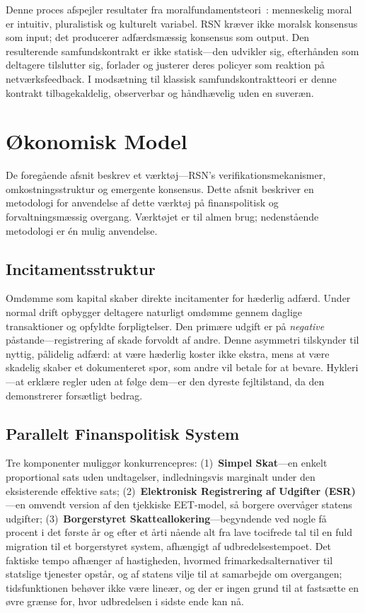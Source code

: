 \documentclass[11pt,a4paper,twocolumn]{article}
\begin{document}
Denne proces afspejler resultater fra moralfundamentsteori~\cite{haidt2012}: menneskelig moral er intuitiv, pluralistisk og kulturelt variabel. RSN kræver ikke moralsk konsensus som input; det producerer adfærdsmæssig konsensus som output. Den resulterende samfundskontrakt er ikke statisk---den udvikler sig, efterhånden som deltagere tilslutter sig, forlader og justerer deres policyer som reaktion på netværksfeedback. I modsætning til klassisk samfundskontraktteori er denne kontrakt tilbagekaldelig, observerbar og håndhævelig uden en suveræn.

\section{Økonomisk Model}

De foregående afsnit beskrev et værktøj---RSN's verifikationsmekanismer, omkostningsstruktur og emergente konsensus. Dette afsnit beskriver en metodologi for anvendelse af dette værktøj på finanspolitisk og forvaltningsmæssig overgang. Værktøjet er til almen brug; nedenstående metodologi er én mulig anvendelse.

\subsection{Incitamentsstruktur}

Omdømme som kapital skaber direkte incitamenter for hæderlig adfærd. Under normal drift opbygger deltagere naturligt omdømme gennem daglige transaktioner og opfyldte forpligtelser. Den primære udgift er på \emph{negative} påstande---registrering af skade forvoldt af andre. Denne asymmetri tilskynder til nyttig, pålidelig adfærd: at være hæderlig koster ikke ekstra, mens at være skadelig skaber et dokumenteret spor, som andre vil betale for at bevare. Hykleri---at erklære regler uden at følge dem---er den dyreste fejltilstand, da den demonstrerer forsætligt bedrag.

\subsection{Parallelt Finanspolitisk System}

Tre komponenter muliggør konkurrencepres: (1)~\textbf{Simpel Skat}---en enkelt proportional sats uden undtagelser, indledningsvis marginalt under den eksisterende effektive sats; (2)~\textbf{Elektronisk Registrering af Udgifter (ESR)}---en omvendt version af den tjekkiske EET-model, så borgere overvåger statens udgifter; (3)~\textbf{Borgerstyret Skatteallokering}---begyndende ved nogle få procent i det første år og efter et årti nående alt fra lave tocifrede tal til en fuld migration til et borgerstyret system, afhængigt af udbredelsestempoet. Det faktiske tempo afhænger af hastigheden, hvormed frimarkedsalternativer til statslige tjenester opstår, og af statens vilje til at samarbejde om overgangen; tidsfunktionen behøver ikke være lineær, og der er ingen grund til at fastsætte en øvre grænse for, hvor udbredelsen i sidste ende kan nå.
\end{document}

